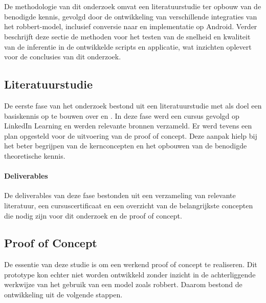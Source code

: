 
\chapter{}%
\label{ch:methodologie}

De methodologie van dit onderzoek omvat een literatuurstudie ter opbouw van de benodigde kennis, gevolgd door de ontwikkeling van verschillende integraties van het \gls{robbert}-model, inclusief conversie naar  en implementatie op Android. Verder beschrijft deze sectie de methoden voor het testen van de snelheid en kwaliteit van de inferentie in de ontwikkelde scripts en applicatie, wat inzichten oplevert voor de conclusies van dit onderzoek.

\section{Literatuurstudie}

De eerste fase van het onderzoek bestond uit een literatuurstudie met als doel een basiskennis op te bouwen over  en . In deze fase werd een cursus gevolgd op LinkedIn Learning en werden relevante bronnen verzameld. Er werd tevens een plan opgesteld voor de uitvoering van de proof of concept. Deze aanpak hielp bij het beter begrijpen van de kernconcepten en het opbouwen van de benodigde theoretische kennis.

\subsubsection{Deliverables}
De deliverables van deze fase bestonden uit een verzameling van relevante literatuur, een cursuscertificaat en een overzicht van de belangrijkste concepten die nodig zijn voor dit onderzoek en de proof of concept.

\section{Proof of Concept}

De essentie van deze studie is om een werkend proof of concept te realiseren. Dit prototype kon echter niet worden ontwikkeld zonder inzicht in de achterliggende werkwijze van het gebruik van een model zoals \gls{robbert}. Daarom bestond de ontwikkeling uit de volgende stappen.

